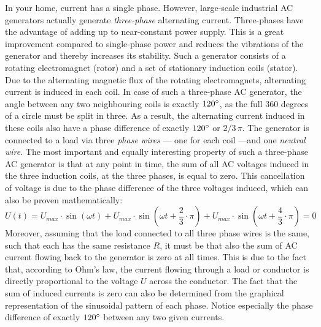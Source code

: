 In your home, current has a single phase. However, large-scale industrial AC generators actually generate \emph{three-phase} alternating current. Three-phases have the advantage of adding up to near-constant power supply. This is a great improvement compared to single-phase power and reduces the vibrations of the generator and thereby increases its stability. Such a generator consists of a rotating electromagnet (rotor) and a set of stationary induction coils (stator). Due to the alternating magnetic flux of the rotating electromagnets, alternating current is induced in each coil. In case of such a three-phase AC generator, the angle between any two neighbouring coils is exactly $120\degree$, as the full 360 degrees of a circle must be split in three. As a result, the alternating current induced in these coils also have a phase difference of exactly $120\degree$ or $2/3 \, \pi$. The generator is connected to a load via three \emph{phase wires} --- one for each coil ---and one \emph{neutral wire}. The most important and equally interesting property of such a three-phase AC generator is that at any point in time, the sum of all AC voltages induced in the three induction coils, at the three phases, is equal to zero. This cancellation of voltage is due to the phase difference of the three voltages induced, which can also be proven mathematically: $$U(t) = U_{max} \cdot \sin(\omega t) + U_{max} \cdot \sin(\omega t + \frac{2}{3} \cdot \pi) + U_{max} \cdot \sin(\omega t + \frac{4}{3} \cdot \pi) = 0$$ Moreover, assuming that the load connected to all three phase wires is the same, such that each has the same resistance $R$, it must be that also the sum of AC current flowing back to the generator is zero at all times. This is due to the fact that, according to Ohm's law, the current flowing through a load or conductor is directly proportional to the voltage $U$ across the conductor. The fact that the sum of induced currents is zero can also be determined from the graphical representation of the sinusoidal pattern of each phase. Notice especially the phase difference of exactly $120\degree$ between any two given currents.

